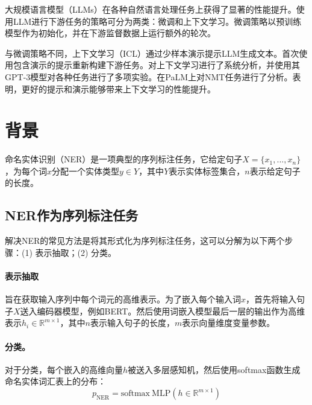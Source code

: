 \documentclass[supercite]{Experimental_Report}
\theoremstyle{definition}
\begin{document}
大规模语言模型（LLMs）\cite{brown2020language,rae2021scaling,smith2022using,hoffmann2022training,chowdhery2022palm}在各种自然语言处理任务上获得了显著的性能提升\cite{hegselmann2022tabllm,vilar2022prompting,perez2021true,pietrzak2021story,wei2021finetuned}。使用LLM进行下游任务的策略可分为两类：微调和上下文学习。微调策略以预训练模型作为初始化，并在下游监督数据上运行额外的轮次\cite{raffel2020exploring,gururangan2018annotation,roberts2020much,guu2020retrieval}。

与微调策略不同，上下文学习（ICL）通过少样本演示提示LLM生成文本。\cite{radford2019language}首次使用包含演示的提示重新构建下游任务。\cite{brown2020language}对上下文学习进行了系统分析，并使用其GPT-3模型对各种任务进行了多项实验。\cite{chowdhery2022palm}在PaLM上对NMT任务进行了分析。\cite{perez2021true,lu2021fantastically,rubin2021learning}表明，更好的提示和演示能够带来上下文学习的性能提升。

\section{背景}
\label{background_ner}

命名实体识别（NER）是一项典型的序列标注任务，它给定句子$X=\{x_{1},...,x_{n}\}$，为每个词$x$分配一个实体类型$y\in Y$，其中$Y$表示实体标签集合，$n$表示给定句子的长度。

\subsection{NER作为序列标注任务}

解决NER的常见方法是将其形式化为序列标注任务，这可以分解为以下两个步骤：(1) 表示抽取；(2) 分类。

\paragraph{表示抽取}旨在获取输入序列中每个词元的高维表示。为了嵌入每个输入词$x$，首先将输入句子$X$送入编码器模型，例如BERT\cite{devlin2018bert}。然后使用词嵌入模型最后一层的输出作为高维表示$h_{i}\in \mathbb{R}^{m \times 1}$，其中$n$表示输入句子的长度，$m$表示向量维度变量参数。

\paragraph{分类。}对于分类，每个嵌入的高维向量$h$被送入多层感知机，然后使用softmax函数生成命名实体词汇表上的分布：
\begin{equation}
p_{\text{NER}} = \text{softmax}{\ \text{MLP}(h\in \mathbb{R}^{m \times 1})}
\end{equation}
\end{document}
